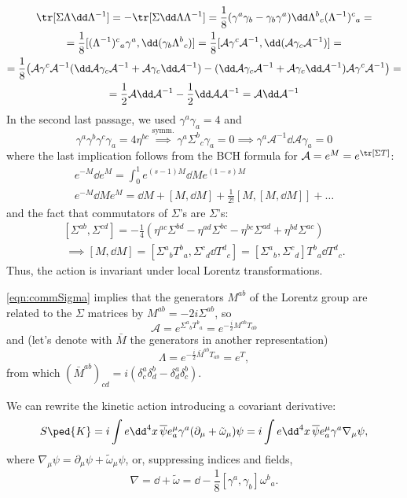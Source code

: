 \documentclass[a4paper,12pt]{book}
\begin{document}
\begin{itemize}
\begin{multline*}
\tr[\Sigma\Lambda\dd\Lambda^{-1}]=-\tr[\Sigma\dd\Lambda\Lambda^{-1}]=\frac18(\gamma^a\gamma_b-\gamma_b\gamma^a)\dd\Lambda^b{}_c(\Lambda^{-1})^c{}_a=\\
=\frac18[(\Lambda^{-1})^c{}_a\gamma^a,\dd(\gamma_b\Lambda^b{}_c)]=\frac18[\mathcal A\gamma^c\mathcal A^{-1},\dd(\mathcal A\gamma_c\mathcal A^{-1})]=\\
=\frac18\bigl(\mathcal A\gamma^c\mathcal A^{-1}(\dd\mathcal A\gamma_c\mathcal A^{-1}+\mathcal A\gamma_c\dd\mathcal A^{-1})-(\dd\mathcal A\gamma_c\mathcal A^{-1}+\mathcal A\gamma_c\dd\mathcal A^{-1})\mathcal A\gamma^c\mathcal A^{-1}\bigr)=\\
=\frac12\mathcal A\dd\mathcal A^{-1}-\frac12\dd\mathcal A\mathcal A^{-1}=\mathcal A\dd\mathcal A^{-1}
\end{multline*}
In the second last passage, we used $\gamma^a\gamma_a=4$ and
\[\gamma^a\gamma^b\gamma^c\gamma_a=4\eta^{bc}\overset{\text{symm.}}{\implies}\gamma^a\Sigma^b{}_c\gamma_a=0\implies\gamma^a\mathcal A^{-1}\dd\mathcal A\gamma_a=0\]
where the last implication follows from the BCH formula for $\mathcal A=e^M=e^{\tr[\Sigma T]}$:
\begin{gather*}
e^{-M}\dd e^M=\int_0^1e^{(s-1)M}\dd Me^{(1-s)M}\\
e^{-M}\dd Me^M=\dd M+[M,\dd M]+\frac{1}{2!}[M,[M,\dd M]]+\ldots
\end{gather*}
and the fact that commutators of $\Sigma$'s are $\Sigma$'s:
\begin{gather}
\label{eqn:commSigma}
[\Sigma^{ab},\Sigma^{cd}]=-\frac{1}{4}(\eta^{ac}\Sigma^{bd}-\eta^{ad}\Sigma^{bc}-\eta^{bc}\Sigma^{ad}+\eta^{bd}\Sigma^{ac})\\\
\implies [M,\dd M]=[\Sigma^a{}_bT^b{}_a,\Sigma^c{}_d\dd T^d{}_c]=[\Sigma^a{}_b,\Sigma^c{}_d]T^b{}_a\dd T^d{}_c.\nonumber
\end{gather}
Thus, the action is invariant under local Lorentz transformations.
\end{itemize}
\cref{eqn:commSigma} implies that the generators $M^{ab}$ of the Lorentz group are related to the $\Sigma$ matrices by $M^{ab}=-2i\Sigma^{ab}$, so
\[\mathcal A=e^{\Sigma^a{}_bT^b{}_a}=e^{-\frac{i}{2}M^{ab}T_{ab}}\]
and (let's denote with $\bar M$ the generators in another representation)
\[\Lambda=e^{-\frac{i}{2}\bar M^{ab}T_{ab}}=e^T,\]
from which $(\bar M^{ab})_{cd}=i(\delta^a_c\delta^b_d-\delta^a_d\delta^b_c)$.

We can rewrite the kinetic action introducing a covariant derivative:
\[S\ped{K}=i\int e\dd^4x\,\overline\psi e^\mu_a\gamma^a(\partial_\mu+\tilde\omega_\mu)\psi=i\int e\dd^4x\,\overline\psi e^\mu_a\gamma^a\nabla_\mu\psi,\]
where $\nabla_\mu\psi=\partial_\mu\psi+\tilde\omega_\mu\psi$, or, suppressing indices and fields,
\[\nabla=\dd+\tilde\omega=\dd-\frac{1}{8}[\gamma^a,\gamma_b]\omega^b{}_a.\]
\end{document}
